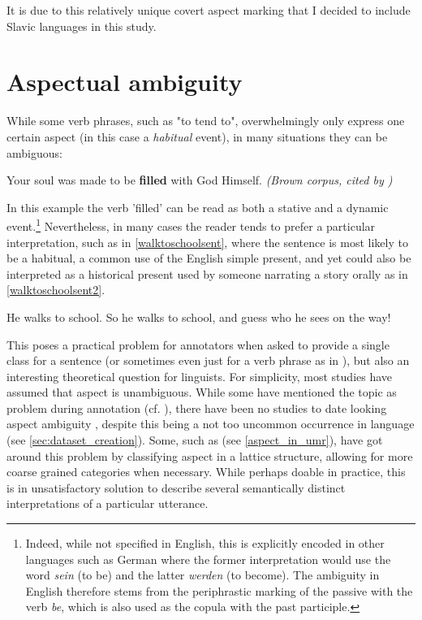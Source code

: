 It is due to this relatively unique covert aspect marking that I decided to include Slavic languages in this study.

\section{Aspectual ambiguity}
While some verb phrases, such as "to tend to", overwhelmingly only express one certain aspect (in this case a \emph{habitual} event), in many situations they can be ambiguous:
\begin{exe}
    \ex Your soul was made to be \textbf{filled} with God Himself. \emph{(Brown corpus, cited by \citet{Friedrich2014AutomaticPO})}
    \label{sent:be_filled_w_god}
\end{exe}
In this example the verb 'filled' can be read as both a stative and a dynamic event.\footnote{Indeed, while not specified in English, this is explicitly encoded in other languages such as German where the former interpretation would use the word \emph{sein} (to be) and the latter \emph{werden} (to become). The ambiguity in English therefore stems from the periphrastic marking of the passive with the verb \emph{be}, which is also used as the copula with the past participle.} Nevertheless, in many cases the reader tends to prefer a particular interpretation, such as in \ref{walktoschoolsent}, where the sentence is most likely to be a habitual, a common use of the English simple present, and yet could also be interpreted as a historical present used by someone narrating a story orally as in \ref{walktoschoolsent2}.

\begin{exe}
    \ex He walks to school.
    \label{walktoschoolsent}
    \ex So he walks to school, and guess who he sees on the way!
    \label{walktoschoolsent2}
\end{exe}

This poses a practical problem for annotators when asked to provide a single class for a sentence (or sometimes even just for a verb phrase as in \citet{siegel-mckeown-2000-learning}), but also an interesting theoretical question for linguists. For simplicity, most studies have assumed that aspect is unambiguous. While some have mentioned the topic as problem during annotation (cf. \citet{croft-etal-2016-annotation, Friedrich2014AutomaticPO}), there have been no studies to date looking aspect ambiguity \citep{friedrich-etal-2023-kind}, despite this being a not too uncommon occurrence in language (see \ref{sec:dataset_creation}). Some, such as \citet{umr} (see \ref{aspect_in_umr}), have got around this problem by classifying aspect in a lattice structure, allowing for more coarse grained categories when necessary. While perhaps doable in practice, this is in unsatisfactory solution to describe several semantically distinct interpretations of a particular utterance.

